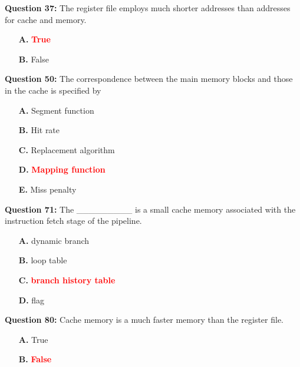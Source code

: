 \documentclass[12pt,a4paper]{article}
\begin{document}
\vspace{0.5cm}

\textbf{Question 37:} The register file employs much shorter addresses than addresses for cache and memory.

\begin{itemize}
    \item[\textbf{A.}] \textcolor{red}{\textbf{True}}
    \item[\textbf{B.}] False
\end{itemize}

\vspace{0.5cm}

\textbf{Question 50:} The correspondence between the main memory blocks and those in the cache is specified by

\begin{itemize}
    \item[\textbf{A.}] Segment function
    \item[\textbf{B.}] Hit rate
    \item[\textbf{C.}] Replacement algorithm
    \item[\textbf{D.}] \textcolor{red}{\textbf{Mapping function}}
    \item[\textbf{E.}] Miss penalty
\end{itemize}

\vspace{0.5cm}

\textbf{Question 71:} The _________ is a small cache memory associated with the instruction fetch stage of the pipeline.

\begin{itemize}
    \item[\textbf{A.}] dynamic branch
    \item[\textbf{B.}] loop table
    \item[\textbf{C.}] \textcolor{red}{\textbf{branch history table}}
    \item[\textbf{D.}] flag
\end{itemize}

\vspace{0.5cm}

\textbf{Question 80:} Cache memory is a much faster memory than the register file.

\begin{itemize}
    \item[\textbf{A.}] True
    \item[\textbf{B.}] \textcolor{red}{\textbf{False}}
\end{itemize}
\end{document}
